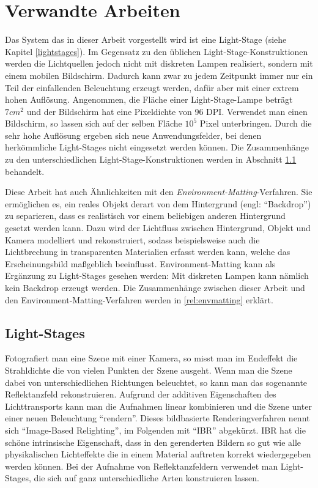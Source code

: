 
\chapter{Verwandte Arbeiten} \label{verwandte_arbeiten}

 
 Das System das in dieser Arbeit vorgestellt wird ist eine Light-Stage (siehe Kapitel \ref{lightstages}).
 Im Gegensatz zu den üblichen Light-Stage-Konstruktionen werden die Lichtquellen jedoch nicht mit diskreten Lampen realisiert, sondern mit einem mobilen Bildschirm.
 Dadurch kann zwar zu jedem Zeitpunkt immer nur ein Teil der einfallenden Beleuchtung erzeugt werden, dafür aber mit einer extrem hohen Auflösung.
 Angenommen, die Fläche einer Light-Stage-Lampe beträgt $7cm^2$ und der Bildschirm hat eine Pixeldichte von 96 DPI.
 Verwendet man einen Bildschirm, so lassen sich auf der selben Fläche $10^5$ Pixel unterbringen.
 Durch die sehr hohe Auflösung ergeben sich neue Anwendungsfelder, bei denen herkömmliche Light-Stages nicht eingesetzt werden können. 
 Die Zusammenhänge zu den unterschiedlichen Light-Stage-Konstruktionen werden in Abschnitt \ref{rel:lightstages} behandelt.
 
 Diese Arbeit hat auch Ähnlichkeiten mit den  \emph{Environment-Matting}-Verfahren.
 Sie ermöglichen es, ein reales Objekt derart von dem Hintergrund (engl: ``Backdrop'') zu separieren, dass es realistisch vor einem beliebigen anderen Hintergrund gesetzt werden kann. 
 Dazu wird der Lichtfluss zwischen Hintergrund, Objekt und Kamera modelliert und rekonstruiert, sodass beispielsweise auch die Lichtbrechung in transparenten Materialien erfasst werden kann, welche das Erscheinungsbild maßgeblich beeinflusst.
 Environment-Matting kann als Ergänzung zu Light-Stages gesehen werden: Mit diskreten Lampen kann nämlich kein Backdrop erzeugt werden. 
 Die Zusammenhänge zwischen dieser Arbeit und den Environment-Matting-Verfahren werden in  \ref{rel:envmatting} erklärt.

 
 
 \section{Light-Stages} \label{rel:lightstages}
  
  Fotografiert man eine Szene mit einer Kamera, so misst man im Endeffekt die Strahldichte die von vielen Punkten der Szene ausgeht.
  Wenn man die Szene dabei von unterschiedlichen Richtungen beleuchtet, so kann man das sogenannte Reflektanzfeld rekonstruieren.
  Aufgrund der additiven Eigenschaften des Lichttransports kann man die Aufnahmen linear kombinieren und die Szene unter einer neuen Beleuchtung ``rendern''.
  Dieses bildbasierte Renderingverfahren nennt sich ``Image-Based Relighting'', im Folgenden mit ``IBR'' abgekürzt.
  IBR hat die schöne intrinsische Eigenschaft, dass in den gerenderten Bildern so gut wie alle physikalischen Lichteffekte die in einem Material auftreten korrekt wiedergegeben werden können. 
  Bei der Aufnahme von Reflektanzfeldern verwendet man Light-Stages, die sich auf ganz unterschiedliche Arten konstruieren lassen.
 
